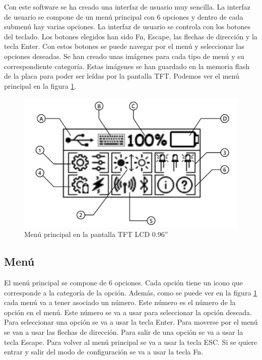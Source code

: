 Con este software se ha creado una interfaz de usuario muy sencilla. La interfaz de usuario se compone de un menú principal con 6 opciones y dentro de cada submenú hay varias opciones. La interfaz de usuario se controla con los botones del teclado. Los botones elegidos han sido Fn, Escape, las flechas de dirección y la tecla Enter. Con estos botones se puede navegar por el menú y seleccionar las opciones deseadas. Se han creado unas imágenes para cada tipo de menú y su correspondiente categoría. Estas imágenes se han guardado en la memoria flash de la placa para poder ser leídas por la pantalla \gls{TFT}. Podemos ver el menú principal en la figura \ref{fig:MenuPrincipal}.

\begin{figure}[H]
\centering
\includegraphics[width=1\textwidth]{imagenes/Capitulos/Cap07/PantallaMenuPrincipal.png}
\caption{Menú principal en la pantalla \gls{TFT} LCD 0.96''}
\label{fig:MenuPrincipal}
\end{figure}

\subsection{Menú}

El menú principal se compone de 6 opciones. Cada opción tiene un icono que corresponde a la categoría de la opción. Además, como se puede ver en la figura \ref{fig:MenuPrincipal} cada menú va a tener asociado un número. Este número es el número de la opción en el menú. Este número se va a usar para seleccionar la opción deseada. Para seleccionar una opción se va a usar la tecla Enter. Para moverse por el menú se van a usar las flechas de dirección. Para salir de una opción se va a usar la tecla Escape. Para volver al menú principal se va a usar la tecla ESC. Si se quiere entrar y salir del modo de configuración se va a usar la tecla Fn.

